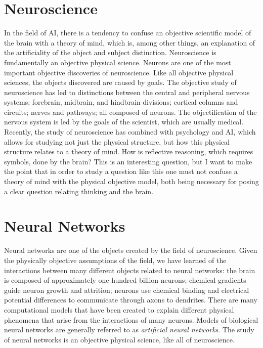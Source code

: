 \section{Neuroscience}

In the field of AI, there is a tendency to confuse an objective
scientific model of the brain with a theory of mind, which is, among
other things, an explanation of the artificiality of the object and
subject distinction.  Neuroscience is fundamentally an objective
physical science.  Neurons are one of the most important objective
discoveries of neuroscience.  Like all objective physical sciences,
the objects discovered are caused by goals.  The objective study of
neuroscience has led to distinctions between the central and
peripheral nervous systems; forebrain, midbrain, and hindbrain
divisions; cortical columns and circuits; nerves and pathways; all
composed of neurons.  The objectification of the nervous system is led
by the goals of the scientist, which are usually medical.  Recently,
the study of neuroscience has combined with psychology and AI, which
allows for studying not just the physical structure, but how this
physical structure relates to a theory of mind.  How is reflective
reasoning, which requires symbols, done by the brain?  This is an
interesting question, but I want to make the point that in order to
study a question like this one must not confuse a theory of mind with
the physical objective model, both being necessary for posing a clear
question relating thinking and the brain.

\section{Neural Networks}

Neural networks are one of the objects created by the field of
neuroscience.  Given the physically objective assumptions of the
field, we have learned of the interactions between many different
objects related to neural networks: the brain is composed of
approximately one hundred billion neurons; chemical gradients guide
neuron growth and attrition; neurons use chemical binding and
electrical potential differences to communicate through axons to
dendrites.  There are many computational models that have been created
to explain different physical phenomena that arise from the
interactions of many neurons.  Models of biological neural networks
are generally referred to as \emph{artificial neural networks}.  The
study of neural networks is an objective physical science, like all of
neuroscience.

